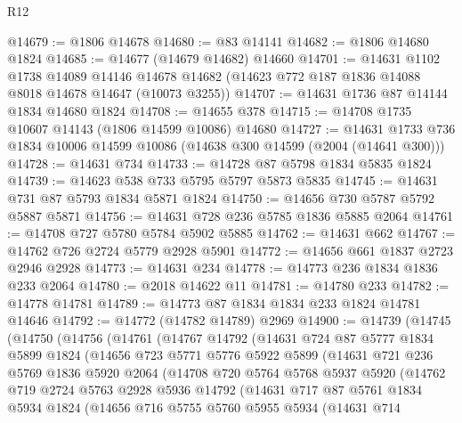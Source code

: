 \begin{lexlean}{R12}
\begin{coremodule}
@14679 := @1806 @14678
@14680 := @83 @14141
@14682 := @1806 @14680 @1824
@14685 := @14677 (@14679 @14682) @14660
@14701 := @14631
    @1102
    @1738
    @14089
    @14146
    @14678
    @14682
    (@14623 @772 @187 @1836 @14088 @8018 @14678 @14647 (@10073 @3255))
@14707 := @14631 @1736 @87 @14144 @1834 @14680 @1824
@14708 := @14655 @378
@14715 := @14708 @1735 @10607 @14143 (@1806 @14599 @10086) @14680
@14727 := @14631 @1733 @736 @1834 @10006 @14599 @10086 (@14638 @300 @14599 (@2004 (@14641 @300)))
@14728 := @14631 @734
@14733 := @14728 @87 @5798 @1834 @5835 @1824
@14739 := @14623 @538 @733 @5795 @5797 @5873 @5835
@14745 := @14631 @731 @87 @5793 @1834 @5871 @1824
@14750 := @14656 @730 @5787 @5792 @5887 @5871
@14756 := @14631 @728 @236 @5785 @1836 @5885 @2064
@14761 := @14708 @727 @5780 @5784 @5902 @5885
@14762 := @14631 @662
@14767 := @14762 @726 @2724 @5779 @2928 @5901
@14772 := @14656 @661 @1837 @2723 @2946 @2928
@14773 := @14631 @234
@14778 := @14773 @236 @1834 @1836 @233 @2064
@14780 := @2018 @14622 @11
@14781 := @14780 @233
@14782 := @14778 @14781
@14789 := @14773 @87 @1834 @1834 @233 @1824 @14781 @14646
@14792 := @14772 (@14782 @14789) @2969
@14900 := @14739
    (@14745
      (@14750
        (@14756
          (@14761
            (@14767
              @14792
              (@14631
                @724
                @87
                @5777
                @1834
                @5899
                @1824
                (@14656
                  @723
                  @5771
                  @5776
                  @5922
                  @5899
                  (@14631
                    @721
                    @236
                    @5769
                    @1836
                    @5920
                    @2064
                    (@14708
                      @720
                      @5764
                      @5768
                      @5937
                      @5920
                      (@14762
                        @719
                        @2724
                        @5763
                        @2928
                        @5936
                        @14792
                        (@14631
                          @717
                          @87
                          @5761
                          @1834
                          @5934
                          @1824
                          (@14656
                            @716
                            @5755
                            @5760
                            @5955
                            @5934
                            (@14631
                              @714

\end{coremodule}
\end{lexlean}
